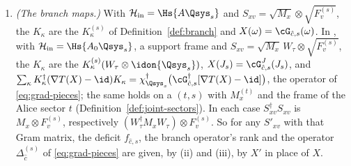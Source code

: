 \begin{lemma}
\begin{enumerate}[label=(\roman*),leftmargin=2.4em]
\item \emph{(The branch maps.)} With $\mathcal{H}_{\mathrm{in}}=\Hs{A\Qsys_s}$
  and $S_{xv}=\sqrt{M_x}\otimes\sqrt{F^{(s)}_v}$, the $K_{\kappa}$ are the
  $K^{(s)}_{\kappa}$ of Definition~\ref{def:branch} and
  $X(\omega)=\cG_{\hat c,s}(\omega)$. In , with
  $\mathcal{H}_{\mathrm{in}}=\Hs{A_0\Qsys_s}$, a support frame and
  $S_{xv}=\sqrt{M_x}\,W_{\tau}\otimes\sqrt{F^{(s)}_v}$, the $K_{\kappa}$ are
  the $K^{(s)}_{\kappa}(W_{\tau}\otimes\idon{\Qsys_s})$,
  $X(J_s)=\cG^{J}_{\hat c,s}(J_s)$, and
  $\sum_{\kappa}K^{\dagger}_{\kappa}(\nabla T(X)-\id)K_{\kappa}
  =\chi^{\dagger}_{\Qsys_s}\big(\cG^{\dagger}_{\hat c,s}[\nabla T(X)-\id]\big)$,
  the operator of \eqref{eq:grad-pieces}; the same holds on a
  $(t,s)$ with $M^{(t)}_x$ and the frame of the Alice sector $t$
  (Definition~\ref{def:joint-sectors}). In each case
  $S^{\dagger}_{xv}S_{xv}$ is $M_x\otimes F^{(s)}_v$, respectively
  $(W_{\tau}^{\dagger}M_xW_{\tau})\otimes F^{(s)}_v$. So for any $S'_{xv}$
  with that Gram matrix, the deficit $f_{\hat c,s}$, the branch operator's
  rank and the operator $\Delta^{(s)}_{\hat c}$ of \eqref{eq:grad-pieces}
  are given, by (ii) and (iii), by $X'$ in place of $X$.
\end{enumerate}
\end{lemma}

